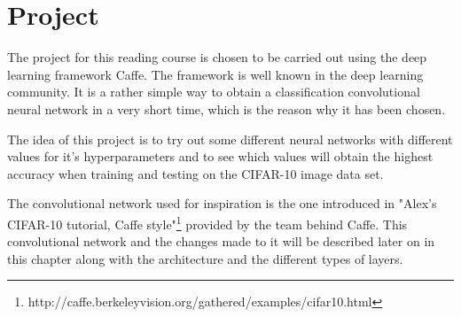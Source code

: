 \graphicspath{{Chapters/Project/}}

\chapter{Project}

The project for this reading course is chosen to be carried out using the deep learning framework Caffe. The framework is well known in the deep learning community. It is a rather simple way to obtain a classification convolutional neural network in a very short time, which is the reason why it has been chosen.

The idea of this project is to try out some different neural networks with different values for it's hyperparameters and to see which values will obtain the highest accuracy when training and testing on the CIFAR-10 image data set.

The convolutional network used for inspiration is the one introduced in "Alex's CIFAR-10 tutorial, Caffe style"\footnote{http://caffe.berkeleyvision.org/gathered/examples/cifar10.html} provided by the team behind Caffe. This convolutional network and the changes made to it will be described later on in this chapter along with the architecture and the different types of layers.








